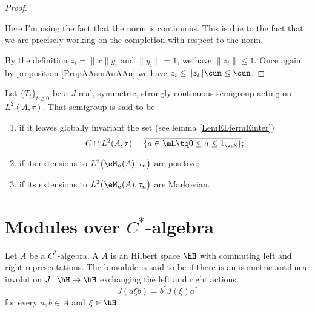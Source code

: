 \begin{proof}
    \begin{probleme}
        Here I'm using the fact that the norm is continuous. This is due to the fact that we are precisely working on the completion with respect to the norm.
    \end{probleme}
    
    By the definition \(z_i=\| x \|y_i\) and \(\| y_i \|=1\), we have \(\| z_i \|\leq 1\). Once again by proposition \ref{PropAAsmAuAAu} we have \(z_i\leq\| z_i \|\cun\leq \cun\).

\end{proof}

\begin{definition}
    Let $\{ T_t \}_{t\geq 0}$ be a $J$-real, symmetric, strongly continuous semigroup acting on $L^2(A,\tau)$. That semigroup is said to be
    \begin{enumerate}
        \item
             if it leaves globally invariant the set (see lemma \ref{LemELfermEinter})
            \begin{equation}
                C\cap L^2(A,\tau)=\overline{ \{ a\in\mL\tq 0\leq a\leq 1_{\vnM} \} };
            \end{equation}
        \item
             if its extensions to $L^2\big( \eM_n(A),\tau_n \big)$ are positive;
        \item
             if its extensions to $L^2\big( \eM_n(A),\tau_n \big)$ are Markovian.
    \end{enumerate}
\end{definition}

\section{Modules over $C^*$-algebra}

\begin{definition}
	Let $A$ be a $C^*$-algebra. A $A$ is an Hilbert space $\hH$ with commuting left and right representations. The bimodule is said to be  if there is an isometric antilinear involution $J\colon \hH\to \hH$ exchanging the left and right actions:
	\begin{equation}
		J(a\xi b)=b^*J(\xi)a^*
	\end{equation}
	for every $a,b\in A$ and $\xi\in\hH$.
\end{definition}


